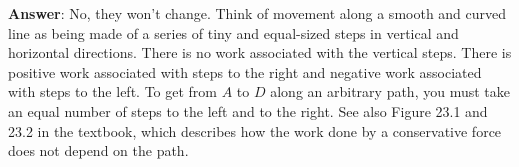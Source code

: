 \documentclass{article}
\begin{document}
\textbf{Answer}: No, they won't change. Think of movement along a smooth and curved line as being made of a series of tiny and equal-sized steps in vertical and horizontal directions. There is no work associated with the vertical steps. There is positive work associated with steps to the right and negative work associated with steps to the left. To get from $A$ to $D$ along an arbitrary path, you must take an equal number of steps to the left and to the right. See also Figure 23.1 and 23.2 in the textbook, which describes how the work done by a conservative force does not depend on the path.
\end{document}
